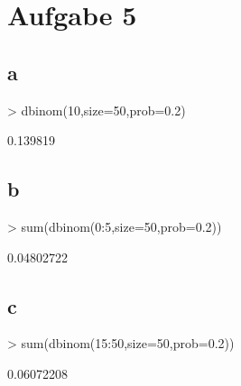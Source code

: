 
\section{Aufgabe 5}
\subsection{a}
\begin{Schunk}
\begin{Sinput}
> dbinom(10,size=50,prob=0.2)
\end{Sinput}
\begin{Soutput}
[1] 0.139819
\end{Soutput}
\end{Schunk}

\subsection{b}
\begin{Schunk}
\begin{Sinput}
> sum(dbinom(0:5,size=50,prob=0.2))
\end{Sinput}
\begin{Soutput}
[1] 0.04802722
\end{Soutput}
\end{Schunk}

\subsection{c}
\begin{Schunk}
\begin{Sinput}
> sum(dbinom(15:50,size=50,prob=0.2))
\end{Sinput}
\begin{Soutput}
[1] 0.06072208
\end{Soutput}
\end{Schunk}

